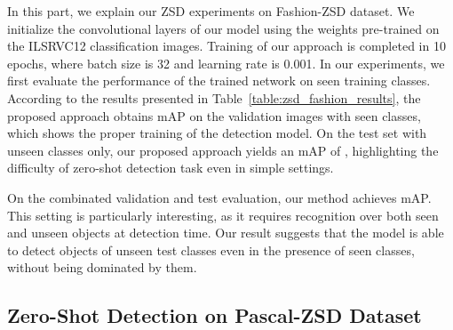 In this part, we explain our ZSD experiments on Fashion-ZSD dataset. We initialize the convolutional layers of our model
using the weights pre-trained on the ILSRVC12\cite{deng2009imagenet} classification images. Training of our approach is completed in 10 epochs,
where batch size is 32 and learning rate is 0.001. In our experiments, we first evaluate the performance of the trained
network on seen training classes. According to the results presented in Table~\ref{table:zsd_fashion_results}, the
proposed approach obtains  mAP on the validation images with seen classes, which shows the proper training
of the detection model. On the test set with unseen classes only, our proposed approach yields an mAP of
, highlighting the difficulty of zero-shot detection task even in simple settings.

On the combinated validation and test evaluation, our method achieves  mAP. This setting
is particularly interesting, as it requires recognition over both seen and unseen objects at detection time.
Our result suggests that the model is able to detect objects of unseen test classes even in the presence of seen 
classes, without being dominated by them.

\begin{table}[]
\centering
{}
\caption{ZSD performances of proposed hybrid method on Fashion-ZSD dataset. We report class based average precision and mean average precision (mAP) scores.}
\label{table:zsd_fashion_results}
\end{table}

\subsection{Zero-Shot Detection on Pascal-ZSD Dataset}
\label{sec:pascalexp}

